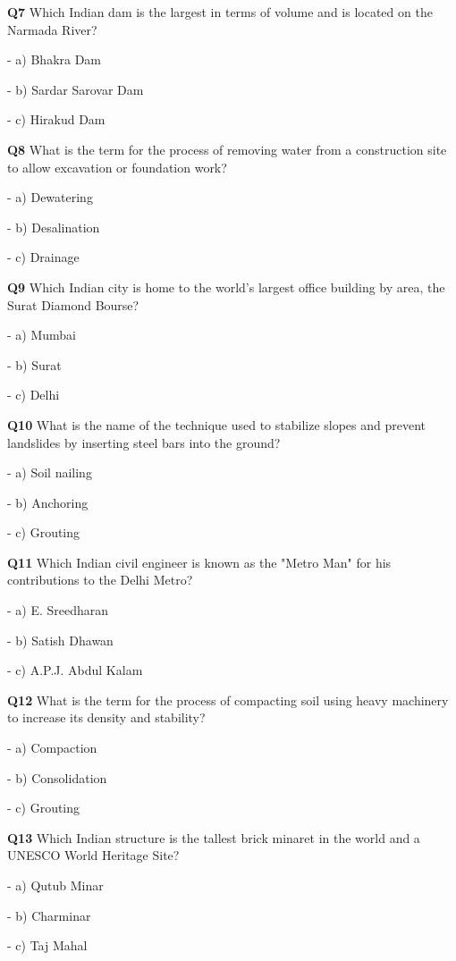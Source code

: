 \textbf{Q7} Which Indian dam is the largest in terms of volume and is located on the Narmada River?\par
\quad - a) Bhakra Dam\par
\quad - b) Sardar Sarovar Dam\par
\quad - c) Hirakud Dam\par

\textbf{Q8} What is the term for the process of removing water from a construction site to allow excavation or foundation work?\par
\quad - a) Dewatering\par
\quad - b) Desalination\par
\quad - c) Drainage\par

\textbf{Q9} Which Indian city is home to the world's largest office building by area, the Surat Diamond Bourse?\par
\quad - a) Mumbai\par
\quad - b) Surat\par
\quad - c) Delhi\par

\textbf{Q10} What is the name of the technique used to stabilize slopes and prevent landslides by inserting steel bars into the ground?\par
\quad - a) Soil nailing\par
\quad - b) Anchoring\par
\quad - c) Grouting\par

\textbf{Q11} Which Indian civil engineer is known as the "Metro Man" for his contributions to the Delhi Metro?\par
\quad - a) E. Sreedharan\par
\quad - b) Satish Dhawan\par
\quad - c) A.P.J. Abdul Kalam\par

\textbf{Q12} What is the term for the process of compacting soil using heavy machinery to increase its density and stability?\par
\quad - a) Compaction\par
\quad - b) Consolidation\par
\quad - c) Grouting\par

\textbf{Q13} Which Indian structure is the tallest brick minaret in the world and a UNESCO World Heritage Site?\par
\quad - a) Qutub Minar\par
\quad - b) Charminar\par
\quad - c) Taj Mahal\par

